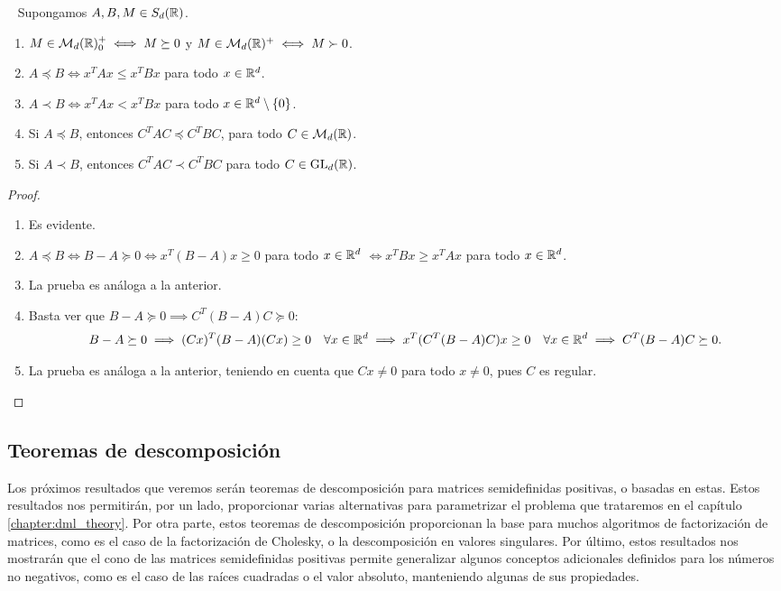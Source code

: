 \begin{prop}~
    Supongamos $A,B,M \in S_d(\mathbb{R})$.
    \begin{enumerate}
        \item $M \in \mathcal{M}_d(\mathbb{R})^+_0 \iff M \succeq 0$ y $M \in \mathcal{M}_d(\mathbb{R})^+ \iff M \succ 0$.
        \item $A \preceq B \iff x^TAx \le x^TBx$ para todo $x \in \mathbb{R}^d$.
        \item $A \prec B \iff x^TAx < x^TBx$ para todo $x \in \mathbb{R}^d\setminus\{0\}$.
        \item Si $A \preceq B$, entonces $C^TAC \preceq C^TBC$, para todo $C \in \mathcal{M}_d(\mathbb{R})$.
        \item Si $A \prec B$, entonces $C^TAC \prec C^TBC$ para todo $C \in \operatorname{GL}_d(\mathbb{R})$.

    \end{enumerate}
\end{prop}

\begin{proof}~
    \begin{enumerate}
        \item Es evidente.
        \item $A \preceq B \iff B - A \succeq 0 \iff x^T(B-A)x \ge 0$ para todo $x \in \mathbb{R}^d$ $\iff x^TBx \ge x^TAx$ para todo $x \in \mathbb{R}^d$.
        \item La prueba es análoga a la anterior.
        \item Basta ver que $B - A \succeq 0 \implies C^T(B-A)C \succeq 0$:
            \[B - A \succeq 0 \implies (Cx)^T(B-A)(Cx) \ge 0 \quad \forall x \in \mathbb{R}^d \implies x^T(C^T(B-A)C)x \ge 0 \quad \forall x \in \mathbb{R}^d \implies C^T(B-A)C \succeq 0. \]
        \item La prueba es análoga a la anterior, teniendo en cuenta que $Cx \ne 0$ para todo $x \ne 0$, pues $C$ es regular.
    \end{enumerate}
\end{proof}

\subsection{Teoremas de descomposición}

Los próximos resultados que veremos serán teoremas de descomposición para matrices semidefinidas positivas, o basadas en estas. Estos resultados nos permitirán, por un lado, proporcionar varias alternativas para parametrizar el problema que trataremos en el capítulo \ref{chapter:dml_theory}. Por otra parte, estos teoremas de descomposición proporcionan la base para muchos algoritmos de factorización de matrices, como es el caso de la factorización de Cholesky, o la descomposición en valores singulares. Por último, estos resultados nos mostrarán que el cono de las matrices semidefinidas positivas permite generalizar algunos conceptos adicionales definidos para los números no negativos, como es el caso de las raíces cuadradas o el valor absoluto, manteniendo algunas de sus propiedades.


